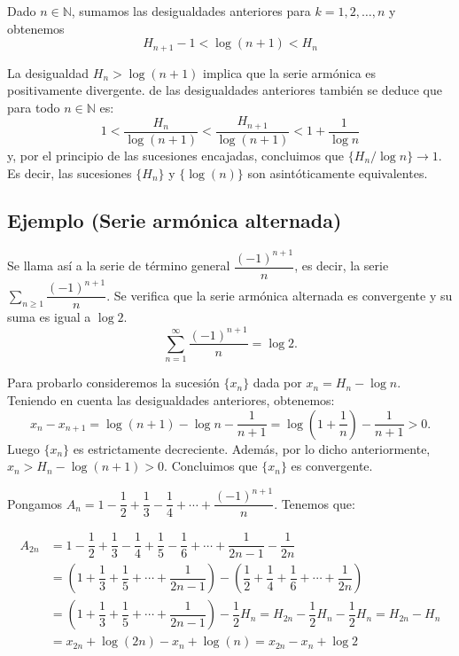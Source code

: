 \documentclass[10pt,a4paper]{article}
\begin{document}
	Dado $n \in \mathbb{N}$, sumamos las desigualdades anteriores para $ k = 1, 2, \dots, n$ y obtenemos 
	$$H_{n+1} - 1 < \log(n+1) < H_n$$
	
	La desigualdad $H_n > \log(n+1)$ implica que la serie armónica es positivamente divergente. de las desigualdades anteriores también se deduce que para todo $n \in \mathbb{N}$ es:
	$$1 < \dfrac{H_n}{\log(n+1)} < \dfrac{H_{n+1}}{\log(n+1)} < 1 + \dfrac{1}{\log n}$$
	y, por el principio de las sucesiones encajadas, concluimos que $\{H_n / \log n\} \rightarrow 1$. Es decir, las sucesiones $\{H_n\}$ y $\{\log(n)\}$ son asintóticamente equivalentes.
	
	\subsection{Ejemplo (Serie armónica alternada)}
	
	Se llama así a la serie de término general $\dfrac{(-1)^{n+1}}{n}$, es decir, la serie $\displaystyle \sum_{n \geq 1} \dfrac{(-1)^{n+1}}{n}$. Se verifica que la serie armónica alternada es convergente y su suma es igual a $\log 2$.
	$$\sum_{n = 1} ^\infty \dfrac{(-1) ^{n+1}}{n} = \log 2.$$
	
	Para probarlo consideremos la sucesión $\{x_n\}$ dada por $x_n = H_n - \log n$. Teniendo en cuenta las desigualdades anteriores, obtenemos:
	$$x_n - x_{n+1} = \log (n+1) - \log n - \dfrac{1}{n+1} = \log\left(1 + \dfrac{1}{n}\right) - \dfrac{1}{n+1} > 0.$$
	Luego $\{x_n\}$ es estrictamente decreciente. Además, por lo dicho anteriormente, $x_n > H_n - \log (n+1) > 0$. Concluimos que $\{x_n\}$ es convergente.
	
	Pongamos $A_n = 1 - \dfrac{1}{2} + \dfrac{1}{3} - \dfrac{1}{4} + \cdots + \dfrac{(-1)^{n+1}}{n}$. Tenemos que:
	
	\begin{equation*}
		\begin{split}
			A_{2n}  & = 1 - \dfrac{1}{2} + \dfrac{1}{3} - \dfrac{1}{4} + \dfrac{1}{5} - \dfrac{1}{6} + \cdots + \dfrac{1}{2n-1} - \dfrac{1}{2n} \\
			& = \left(1 + \dfrac{1}{3} + \dfrac{1}{5} + \cdots + \dfrac{1}{2n-1}\right) - \left(\dfrac{1}{2} + \dfrac{1}{4} + \dfrac{1}{6} + \cdots + \dfrac{1}{2n}\right) \\
			& = \left(1 + \dfrac{1}{3} + \dfrac{1}{5} + \cdots + \dfrac{1}{2n-1}\right) - \dfrac{1}{2}H_n = H_{2n} - \dfrac{1}{2} H_n - \dfrac{1}{2} H_n = H_{2n} - H_n \\
			& = x_{2n} + \log (2n) - x_n + \log (n) = x_{2n} - x_n + \log 2
		\end{split}
	\end{equation*}
	
\end{document}
